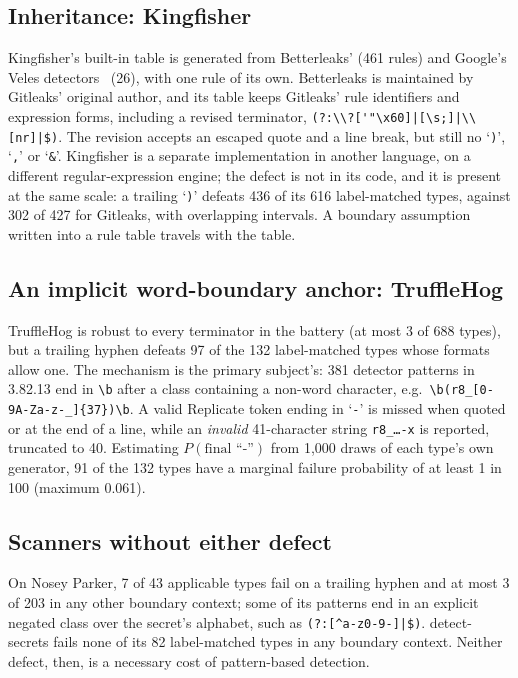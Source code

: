 \documentclass[10pt,journal,compsoc]{IEEEtran}
\begin{document}
\subsection{Inheritance: Kingfisher}
\label{sec:rq3-inherit}

Kingfisher's built-in table is generated from Betterleaks' (461 rules) and Google's Veles detectors~\cite{osvscalibr} (26), with one rule of its own. Betterleaks is maintained by Gitleaks' original author, and its table keeps Gitleaks' rule identifiers and expression forms, including a revised terminator, \lstinline!(?:\\?['"\x60]|[\s;]|\\[nr]|$)!. The revision accepts an escaped quote and a line break, but still no `\texttt{)}', `\texttt{,}' or `\texttt{\&}'. Kingfisher is a separate implementation in another language, on a different regular-expression engine; the defect is not in its code, and it is present at the same scale: a trailing `\texttt{)}' defeats 436 of its 616 label-matched types, against 302 of 427 for Gitleaks, with overlapping intervals. A boundary assumption written into a rule table travels with the table.

\subsection{An implicit word-boundary anchor: TruffleHog}
\label{sec:rq3-trufflehog}

TruffleHog is robust to every terminator in the battery (at most 3 of 688 types), but a trailing hyphen defeats 97 of the 132 label-matched types whose formats allow one. The mechanism is the primary subject's: 381 detector patterns in 3.82.13 end in \verb|\b| after a class containing a non-word character, e.g.\ \lstinline!\b(r8_[0-9A-Za-z-_]{37})\b!. A valid Replicate token ending in `\texttt{-}' is missed when quoted or at the end of a line, while an \emph{invalid} 41-character string \texttt{r8\_\ldots-x} is reported, truncated to 40. Estimating $P(\text{final ``-''})$ from 1{,}000 draws of each type's own generator, 91 of the 132 types have a marginal failure probability of at least 1 in 100 (maximum 0.061).

\subsection{Scanners without either defect}

On Nosey Parker, 7 of 43 applicable types fail on a trailing hyphen and at most 3 of 203 in any other boundary context; some of its patterns end in an explicit negated class over the secret's alphabet, such as \lstinline!(?:[^a-z0-9-]|$)!. detect-secrets fails none of its 82 label-matched types in any boundary context. Neither defect, then, is a necessary cost of pattern-based detection.
\end{document}
